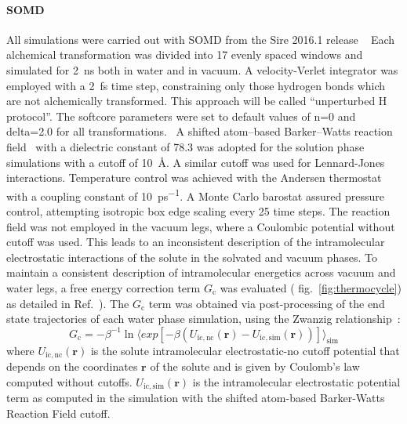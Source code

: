 \documentclass[journal=jctcce,manuscript=article]{achemso}
\begin{document}
\paragraph{SOMD} All simulations were carried out with
SOMD from the Sire 2016.1 release ~\cite{Sire-2016, doi:10.1021/ct300857j}
Each alchemical transformation was
divided into 17 evenly spaced windows and simulated for \SI{2}{ns}
both in water and in vacuum. A velocity-Verlet integrator was
employed with a \SI{2}{fs} time step, constraining only those hydrogen bonds
which are not alchemically transformed.  This approach will be called 
``unperturbed H protocol''. The softcore parameters were set to default 
values of n=0 and delta=2.0 for all transformations.~\cite{doi:10.1021/ct700081t}
A shifted atom--based Barker--Watts reaction field~\cite{doi:10.1080/00268977300102101} with
a dielectric constant of \num{78.3} was adopted for the solution phase
simulations with a cutoff of \SI{10}{\angstrom}. A similar cutoff was used for 
Lennard-Jones interactions. Temperature control was achieved with the Andersen
thermostat~\cite{doi:10.1063/1.439486} with a coupling constant of
\SI{10}{ps^{-1}}.  A Monte Carlo barostat assured pressure control,
attempting isotropic box edge scaling every 25 time steps.
The reaction field was not employed in the vacuum legs, where a Coulombic potential without 
cutoff was used.  This leads to an inconsistent description of the 
intramolecular electrostatic interactions of the solute in the solvated and 
vacuum phases.   To maintain a consistent description of intramolecular energetics across vacuum and water legs,
a free energy correction term $G_{\mathrm{c}}$ was  evaluated ( fig.~\ref{fig:thermocycle}) as detailed in Ref.~). 
The
$G_{\mathrm{c}}$ term was obtained via post-processing of the end state 
trajectories of each water phase simulation, using the Zwanzig 
relationship~\cite{zwanzig_high-temperature_1954}:
\begin{equation}
 \label{eq:ZwanzigDGfunc}
 G_{\mathrm{c}} = -\beta^{-1} \ln \langle exp 
 \left[-\beta(U_{\mathrm{ic,nc}}(\mathbf{r}) - 
 U_{\mathrm{ic,sim}}(\mathbf{r}))\right]\rangle_{\mathrm{sim}}
\end{equation}
where $U_{\mathrm{ic,nc}}(\mathbf{r})$ is the solute intramolecular 
electrostatic-no cutoff 
potential that depends on the coordinates $\mathbf{r}$ of the solute and is given by Coulomb's law computed without cutoffs. 
$U_{\mathrm{ic,sim}}(\mathbf{r})$ is the intramolecular electrostatic potential term as
computed in the simulation with the shifted atom-based Barker-Watts Reaction Field cutoff.
\end{document}

